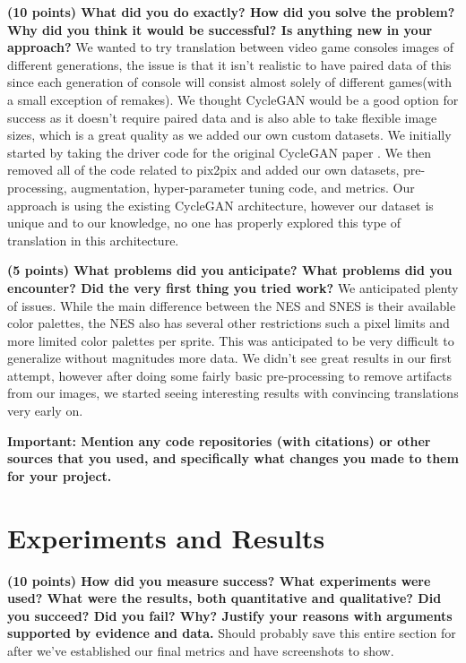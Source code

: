 \documentclass[10pt,twocolumn,letterpaper]{article}
\begin{document}
\textbf{(10 points) What did you do exactly? How did you solve the problem? Why did you think it would be successful? Is anything new in your approach?}
We wanted to try translation between video game consoles images of different generations, the issue is that it isn't realistic to have paired data of this since each generation of console will consist almost solely of different games(with a small exception of remakes). We thought CycleGAN would be a good option for success as it doesn't require paired data and is also able to take flexible image sizes, which is a great quality as we added our own custom datasets. We initially started by taking the driver code for the original CycleGAN paper \cite{CycleGAN}. We then removed all of the code related to pix2pix and added our own datasets, pre-processing, augmentation, hyper-parameter tuning code, and metrics. Our approach is using the existing CycleGAN architecture, however our dataset is unique and to our knowledge, no one has properly explored this type of translation in this architecture.

\textbf{(5 points) What problems did you anticipate? What problems did you encounter? Did the very first thing you tried work?}
We anticipated plenty of issues. While the main difference between the NES and SNES is their available color palettes, the NES also has several other restrictions such a pixel limits and more limited color palettes per sprite. This was anticipated to be very difficult to generalize without magnitudes more data. We didn't see great results in our first attempt, however after doing some fairly basic pre-processing to remove artifacts from our images, we started seeing interesting results with convincing translations very early on.

\textbf{Important: Mention any code repositories (with citations) or other sources that you used, and specifically what changes you made to them for your project.}

\section{Experiments and Results}

\textbf{(10 points) How did you measure success? What experiments were used? What were the results, both quantitative and qualitative? Did you succeed? Did you fail? Why? Justify your reasons with arguments supported by evidence and data.}
Should probably save this entire section for after we've established our final metrics and have screenshots to show.
\end{document}
